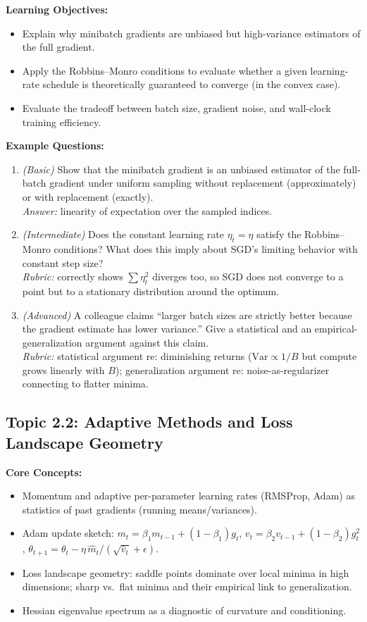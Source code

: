 \documentclass[11pt]{article}
\begin{document}
\textbf{Learning Objectives:}
\begin{itemize}
  \item Explain why minibatch gradients are unbiased but high-variance estimators of the full gradient.
  \item Apply the Robbins--Monro conditions to evaluate whether a given learning-rate schedule is theoretically guaranteed to converge (in the convex case).
  \item Evaluate the tradeoff between batch size, gradient noise, and wall-clock training efficiency.
\end{itemize}

\textbf{Example Questions:}
\begin{enumerate}
  \item \textit{(Basic)} Show that the minibatch gradient is an unbiased estimator of the full-batch gradient under uniform sampling without replacement (approximately) or with replacement (exactly). \\
  \textit{Answer:} linearity of expectation over the sampled indices.
  \item \textit{(Intermediate)} Does the constant learning rate $\eta_t = \eta$ satisfy the Robbins--Monro conditions? What does this imply about SGD's limiting behavior with constant step size? \\
  \textit{Rubric:} correctly shows $\sum \eta_t^2$ diverges too, so SGD does not converge to a point but to a stationary distribution around the optimum.
  \item \textit{(Advanced)} A colleague claims ``larger batch sizes are strictly better because the gradient estimate has lower variance.'' Give a statistical and an empirical-generalization argument against this claim. \\
  \textit{Rubric:} statistical argument re: diminishing returns ($\text{Var} \propto 1/B$ but compute grows linearly with $B$); generalization argument re: noise-as-regularizer connecting to flatter minima.
\end{enumerate}

\subsection{Topic 2.2: Adaptive Methods and Loss Landscape Geometry}

\textbf{Core Concepts:}
\begin{itemize}
  \item Momentum and adaptive per-parameter learning rates (RMSProp, Adam) as statistics of past gradients (running means/variances).
  \item Adam update sketch: $m_t = \beta_1 m_{t-1} + (1-\beta_1) g_t$, $v_t = \beta_2 v_{t-1} + (1-\beta_2) g_t^2$, $\theta_{t+1} = \theta_t - \eta \, \hat m_t / (\sqrt{\hat v_t} + \epsilon)$.
  \item Loss landscape geometry: saddle points dominate over local minima in high dimensions; sharp vs.\ flat minima and their empirical link to generalization.
  \item Hessian eigenvalue spectrum as a diagnostic of curvature and conditioning.
\end{itemize}
\end{document}
